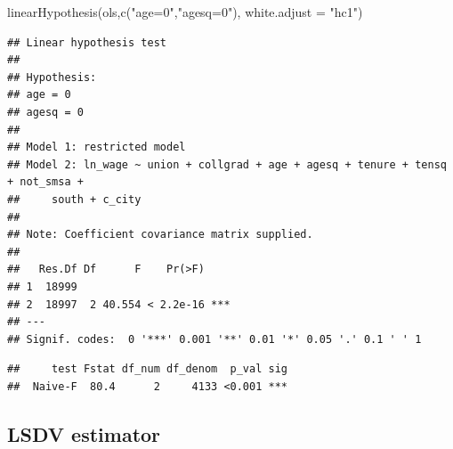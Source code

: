 \documentclass[
]{article}
\newenvironment{Shaded}{\begin{snugshade}}{\end{snugshade}}
\newcommand{\AttributeTok}[1]{\textcolor[rgb]{0.77,0.63,0.00}{#1}}
\newcommand{\FunctionTok}[1]{\textcolor[rgb]{0.00,0.00,0.00}{#1}}
\newcommand{\NormalTok}[1]{#1}
\newcommand{\SpecialCharTok}[1]{\textcolor[rgb]{0.00,0.00,0.00}{#1}}
\newcommand{\StringTok}[1]{\textcolor[rgb]{0.31,0.60,0.02}{#1}}
\begin{document}
\begin{Shaded}
\begin{Highlighting}[]
  \FunctionTok{linearHypothesis}\NormalTok{(ols,}\FunctionTok{c}\NormalTok{(}\StringTok{"age=0"}\NormalTok{,}\StringTok{"agesq=0"}\NormalTok{), }\AttributeTok{white.adjust =} \StringTok{"hc1"}\NormalTok{)}
\end{Highlighting}
\end{Shaded}

\begin{verbatim}
## Linear hypothesis test
## 
## Hypothesis:
## age = 0
## agesq = 0
## 
## Model 1: restricted model
## Model 2: ln_wage ~ union + collgrad + age + agesq + tenure + tensq + not_smsa + 
##     south + c_city
## 
## Note: Coefficient covariance matrix supplied.
## 
##   Res.Df Df      F    Pr(>F)    
## 1  18999                        
## 2  18997  2 40.554 < 2.2e-16 ***
## ---
## Signif. codes:  0 '***' 0.001 '**' 0.01 '*' 0.05 '.' 0.1 ' ' 1
\end{verbatim}

\begin{Shaded}
\end{Shaded}

\begin{verbatim}
##     test Fstat df_num df_denom  p_val sig
##  Naive-F  80.4      2     4133 <0.001 ***
\end{verbatim}

\hypertarget{lsdv-estimator}{%
\subsection{LSDV estimator}\label{lsdv-estimator}}
\end{document}
